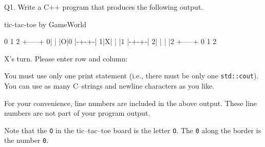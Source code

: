 Q1. Write a C++ program that produces the following output. 
\begin{console}[numbers=left]
tic-tac-toe
by GameWorld

  0 1 2
 +-----+
0| | |O|0
 |-+-+-|
1|X| | |1
 |-+-+-|
2| | | |2
 +-----+
  0 1 2

X's turn. Please enter row and column:

\end{console}
You must use only one print statement 
(i.e., there must be only one \verb!std::cout!). 
You can use as many C--strings and newline characters as you like.

For your convenience, line numbers are included in the above output.
These line numbers are not part of your program output.

Note that the \verb!O! in the tic--tac--toe board is the letter \verb!O!. 
The \verb!0! along the border is the number \verb!0!.

